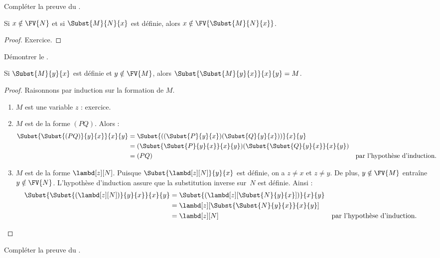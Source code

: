 \documentclass[../../../include/open-logic-section]{subfiles}
\begin{document}
\begin{prob}
Compléter la preuve du
.
\end{prob}

\begin{thm}
Si $x \notin \FV{N}$ et si
$\Subst{M}{N}{x}$ est définie, alors
$x \notin \FV{\Subst{M}{N}{x}}$.
\end{thm}

\begin{proof}
Exercice.
\end{proof}

\begin{prob}
Démontrer le .
\end{prob}

\begin{thm}
Si $\Subst{M}{y}{x}$ est définie et
$y \notin \FV{M}$, alors
$\Subst{\Subst{M}{y}{x}}{x}{y} = M$.
\end{thm}

\begin{proof}
Raisonnons par induction sur la formation de $M$.
\begin{enumerate}
\item $M$ est une variable $z$ : exercice.
\item $M$ est de la forme $(PQ)$. Alors :
  \begin{align*}
    \Subst{\Subst{(PQ)}{y}{x}}{x}{y}
    &=\Subst{((\Subst{P}{y}{x})(\Subst{Q}{y}{x}))}{x}{y} \\
    &= (\Subst{\Subst{P}{y}{x}}{x}{y})
       (\Subst{\Subst{Q}{y}{x}}{x}{y}) \\
    &= (PQ) && \text{par l'hypothèse d'induction}.
  \end{align*}
\item $M$ est de la forme $\lambd[z][N]$.
  Puisque $\Subst{\lambd[z][N]}{y}{x}$
  est définie, on a $z \neq x$ et $z \neq y$.
  De plus, $y \notin \FV{M}$ entraîne
  $y \notin \FV{N}$. L'hypothèse d'induction
  assure que la substitution inverse sur~$N$
  est définie. Ainsi :
  \begin{align*}
    \Subst{\Subst{(\lambd[z][N])}{y}{x}}{x}{y}
    &= \Subst{(\lambd[z][\Subst{N}{y}{x}])}{x}{y} \\
    &= \lambd[z][\Subst{\Subst{N}{y}{x}}{x}{y}] \\
    &= \lambd[z][N]
       && \text{par l'hypothèse d'induction}.
  \end{align*}
\end{enumerate}
\end{proof}

\begin{prob}
Compléter la preuve du
.
\end{prob}
\end{document}
